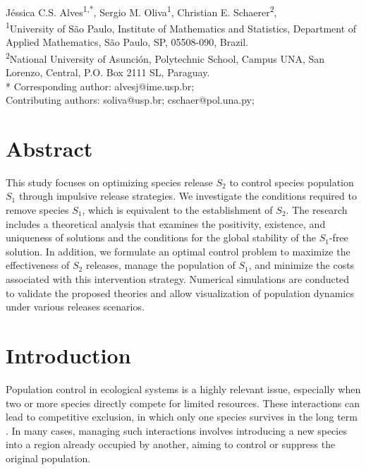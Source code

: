 \documentclass[10pt,letterpaper]{article}
\begin{document}
\vspace*{0.35in}

\begin{flushleft}
{\Large
\textbf{}
}
\newline
\\
Jéssica C.S. Alves\textsuperscript{1,*},
Sergio M. Oliva\textsuperscript{1},
Christian E. Schaerer\textsuperscript{2},
\\
\bigskip
\textsuperscript{1}University of São Paulo, Institute of Mathematics and Statistics, Department of Applied Mathematics, São Paulo, SP, 05508-090, Brazil.
\\
\textsuperscript{2}National University of Asunción, Polytechnic School, Campus UNA, San Lorenzo, Central, P.O. Box 2111 SL, Paraguay.
\\
\bigskip
* Corresponding author: alvesj@ime.usp.br;\\
Contributing authors: soliva@usp.br; cschaer@pol.una.py;

\end{flushleft}

\section*{Abstract}
This study focuses on optimizing species release $S_2$ to control species population $S_1$ through impulsive release strategies. We investigate the conditions required to remove species $S_1$, which is equivalent to the establishment of $S_2$. The research includes a theoretical analysis that examines the positivity, existence, and uniqueness of solutions and the conditions for the global stability of the $S_1$-free solution. In addition, we formulate an optimal control problem to maximize the effectiveness of $S_2$ releases, manage the population of $S_1$, and minimize the costs associated with this intervention strategy. Numerical simulations are conducted to validate the proposed theories and allow visualization of population dynamics under various releases scenarios.


\section{Introduction}

Population control in ecological systems is a highly relevant issue, especially when two or more species directly compete for limited resources. These interactions can lead to competitive exclusion, in which only one species survives in the long term \cite{HOLT2017Species}. In many cases, managing such interactions involves introducing a new species into a region already occupied by another, aiming to control or suppress the original population.
\end{document}
